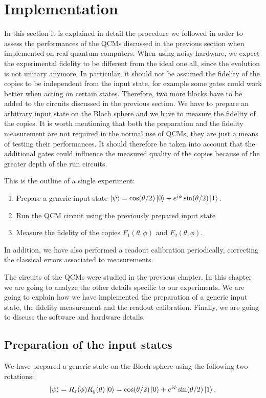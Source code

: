 \chapter{Implementation}
\label{sec:implementation}

In this section it is explained in detail the procedure we followed in order to assess the performances of the QCMs discussed in the previous section when implemented on real quantum computers.
When using noisy hardware, we expect the experimental fidelity to be different from the ideal one all, since the evolution is not unitary anymore.
In particular, it should not be assumed the fidelity of the copies to be independent from the input state, for example some gates could work better when acting on certain states.
Therefore, two more blocks have to be added to the circuits discussed in the previous section. 
We have to prepare an arbitrary input state on the Bloch sphere and we have to measure the fidelity of the copies.
It is worth mentioning that both the preparation and the fidelity measurement are not required in the normal use of QCMs, they are just a means of testing their performances.
It should therefore be taken into account that the additional gates could influence the measured quality of the copies because of the greater depth of the run circuits.

This is the outline of a single experiment:
\begin{enumerate}
    \item Prepare a generic input state $\ket{\psi}=\cos(\theta/2)\ket{0}+e^{i\phi}\sin(\theta/2)\ket{1}$.
    \item Run the QCM circuit using the previously prepared input state
    \item Measure the fidelity of the copies $F_{1}(\theta,\phi)$ and $F_{2}(\theta,\phi)$.
\end{enumerate}
In addition, we have also performed a readout calibration periodically, correcting the classical errors associated to measurements.

The circuits of the QCMs were studied in the previous chapter. In this chapter we are going to analyze the other details specific to our experiments.
We are going to explain how we have implemented the preparation of a generic input state, the fidelity measurement and the readout calibration.
Finally, we are going to discuss the software and hardware details.


\section{Preparation of the input states}
We have prepared a generic state on the Bloch sphere using the following two rotations:
\[
    \ket{\psi}=R_z(\phi)R_y(\theta)\ket{0}=\cos(\theta/2)\ket{0}+e^{i\phi}\sin(\theta/2)\ket{1},
\]

